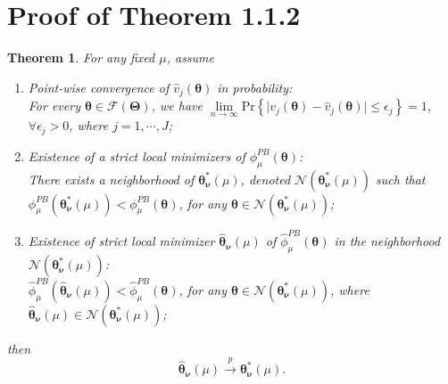 \documentclass[12pt]{article}
\newcommand{\wh}{\widehat}
\newcommand{\bs}{ \boldsymbol}
\newcommand{\ml}{\mathcal}
\newcommand{\lt}{\left}
\newcommand{\rt}{\right}
\newtheorem{theorem}{Theorem}[section]
\begin{document}
\section{Proof of Theorem 1.1.2}
\begin{theorem}
	For any fixed $\mu$, assume 
	\begin{enumerate}
		\item Point-wise convergence of $\wh{v}_j(\bs{\theta})$ in probability:\\ For every $ \bs{\theta} \in \ml{F}(\bs{\Theta})$, we have $ \underset{n \to \infty}{\lim} \text{Pr} \lt\{ \mid v_j(\bs{\theta}) - \wh{v}_j(\bs{\theta}) \mid \le \epsilon_j \rt\}  = 1$, $\forall \epsilon_j > 0$, where $j = 1, \cdots, J$;
		\item Existence of a strict local minimizers of $\phi^{PB}_{\mu}\lt(\bs{\theta}\rt)$:\\
		There exists a neighborhood of $\bs{\theta}^{*}_{\bs{\nu}}(\mu)$, denoted $\ml{N}\lt(\bs{\theta}^{*}_{\bs{\nu}}(\mu)\rt)$ such that $\phi^{PB}_{\mu}\lt(\bs{\theta}^{*}_{\bs{\nu}}(\mu)\rt) < \phi^{PB}_{\mu}\lt(\bs{\theta}\rt)$, for any $\bs{\theta} \in \ml{N}\lt(\bs{\theta}^{*}_{\bs{\nu}}(\mu)\rt)$;
		\item Existence of strict local minimizer $\wh{\bs{\theta}}_{\bs{\nu}}(\mu)$ of $\wh{\phi}^{PB}_{\mu}\lt(\bs{\theta}\rt)$ in the neighborhood $\ml{N}\lt(\bs{\theta}^{*}_{\bs{\nu}}(\mu)\rt)$:\\  
		$ \wh{\phi}^{PB}_{\mu}\lt(\wh{\bs{\theta}}_{\bs{\nu}}(\mu)\rt) < \wh{\phi}^{PB}_{\mu}\lt(\bs{\theta}\rt)$, for any $\bs{\theta} \in \ml{N}\lt(\bs{\theta}^{*}_{\bs{\nu}}(\mu)\rt)$, where $\wh{\bs{\theta}}_{\bs{\nu}}(\mu) \in \ml{N}\lt(\bs{\theta}^{*}_{\bs{\nu}}(\mu)\rt)$;
	\end{enumerate} then 
	$$\wh{\bs{\theta}}_{\bs{\nu}}(\mu) \overset{p}{\to} \bs{\theta}^{*}_{\bs{\nu}}(\mu).$$
	
\end{theorem}
\end{document}
